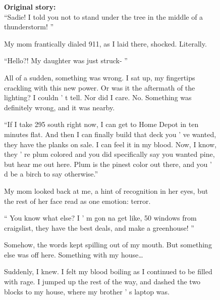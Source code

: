 \begin{figure}[!htbp]
\footnotesize

    \begin{mdframed}[
        backgroundcolor=lightgray,
        linewidth=2pt,
        linecolor=lightblue,
        frametitle={\textbf{Prompt:} You are at the park with your kids , when you see the telltale signs of a lightning strike . You divert your kids from danger , but are hit by lightning . Soon after , you discover that your Dad Senses have increased 100 fold },
        frametitlebackgroundcolor=lightblue!20,
        roundcorner=10pt,
        innerleftmargin=10pt,
        innerrightmargin=10pt,
        innertopmargin=10pt,
        innerbottommargin=10pt
    ]
    \raggedright
    \begin{minipage}[t]{\textwidth}
        \textbf{Original story:} \\
``Sadie! I told you not to stand under the tree in the middle of a thunderstorm! ” 
 
 My mom frantically dialed 911, as I laid there, shocked. Literally. 
 
 ``Hello?! My daughter was just struck- ''
 
 All of a sudden, something was wrong. I sat up, my fingertips crackling with this new power. Or was it the aftermath of the lighting? I couldn ’ t tell. Nor did I care. No. Something was definitely wrong, and it was nearby. 
 
 ``If I take 295 south right now, I can get to Home Depot in ten minutes flat. And then I can finally build that deck you ’ ve wanted, they have the planks on sale. I can feel it in my blood. Now, I know, they ’ re plum colored and you did specifically say you wanted pine, but hear me out here. Plum is the pinest color out there, and you ’ d be a birch to say otherwise.'' 
 
 My mom looked back at me, a hint of recognition in her eyes, but the rest of her face read as one emotion: terror. 
 
 “ You know what else? I ’ m gon na get like, 50 windows from craigslist, they have the best deals, and make a greenhouse! ” 
 
 Somehow, the words kept spilling out of my mouth. But something else was off here. Something with my house… 
 
 Suddenly, I knew. I felt my blood boiling as I continued to be filled with rage. I jumped up the rest of the way, and dashed the two blocks to my house, where my brother ’ s laptop was. 
 

\end{minipage}
\end{mdframed}
\end{figure}
